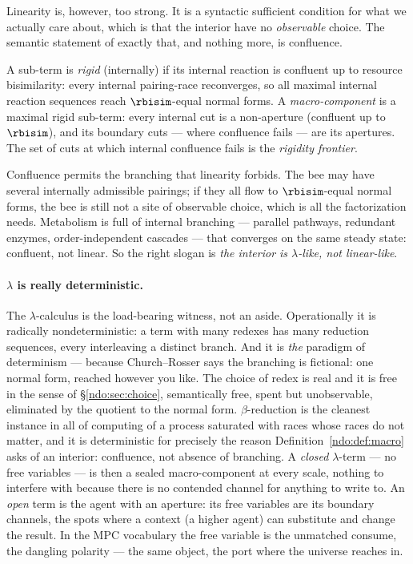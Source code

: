 Linearity is, however, too strong. It is a syntactic sufficient condition for what
we actually care about, which is that the interior have no \emph{observable} choice.
The semantic statement of exactly that, and nothing more, is confluence.

\begin{definition}\label{ndo:def:macro}
A sub-term is \emph{rigid} (internally) if its internal reaction is confluent up to
resource bisimilarity: every internal pairing-race reconverges, so all maximal
internal reaction sequences reach $\rbisim$-equal normal forms. A
\emph{macro-component} is a maximal rigid sub-term: every internal cut is a
non-aperture (confluent up to $\rbisim$), and its boundary cuts --- where
confluence fails --- are its apertures. The set of cuts at which internal
confluence fails is the \emph{rigidity frontier}.
\end{definition}

\noindent
Confluence permits the branching that linearity forbids. The bee may have several
internally admissible pairings; if they all flow to $\rbisim$-equal normal forms,
the bee is still not a site of observable choice, which is all the factorization
needs. Metabolism is full of internal branching --- parallel pathways, redundant
enzymes, order-independent cascades --- that converges on the same steady state:
confluent, not linear. So the right slogan is \emph{the interior is
$\lambda$-like, not linear-like}.

\paragraph{$\lambda$ is really deterministic.}
The $\lambda$-calculus is the load-bearing witness, not an aside. Operationally it
is radically nondeterministic: a term with many redexes has many reduction
sequences, every interleaving a distinct branch. And it is \emph{the} paradigm of
determinism --- because Church--Rosser says the branching is fictional: one normal
form, reached however you like. The choice of redex is real and it is free in the
sense of \S\ref{ndo:sec:choice}, semantically free, spent but unobservable, eliminated
by the quotient to the normal form. $\beta$-reduction is the cleanest instance in
all of computing of a process saturated with races whose races do not matter, and
it is deterministic for precisely the reason Definition~\ref{ndo:def:macro} asks of an
interior: confluence, not absence of branching. A \emph{closed} $\lambda$-term ---
no free variables --- is then a sealed macro-component at every scale, nothing to
interfere with because there is no contended channel for anything to write to. An
\emph{open} term is the agent with an aperture: its free variables are its boundary
channels, the spots where a context (a higher agent) can substitute and change the
result. In the MPC vocabulary the free variable is the unmatched consume, the
dangling polarity --- the same object, the port where the universe reaches in.

